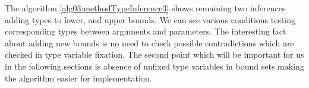 \par
{}
The algorithm \ref{alg03:methodTypeInference3} shows remaining two inferences adding types to lower, and upper bounds.
We can see various conditions testing corresponding types between arguments and parameters.
The interesting fact about adding new bounds is no need to check possible contradictions which are checked in type variable fixation.
The second point which will be important for us in the following sections is absence of unfixed type variables in bound sets making the algorithm easier for implementation.
\par
\begin{algorithm}



\end{algorithm}

